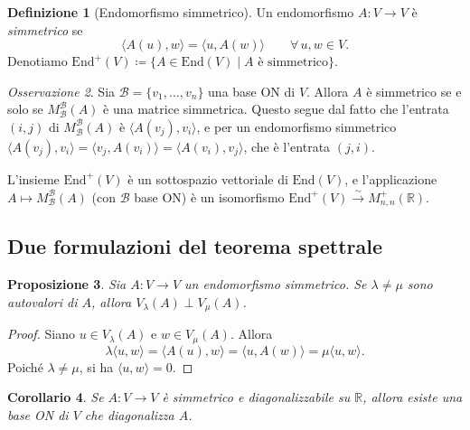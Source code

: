 \documentclass[11pt, a4paper]{book}
\theoremstyle{definition}
\newtheorem{definizione}{Definizione}[section]
\theoremstyle{plain}
\newtheorem{proposizione}[definizione]{Proposizione}
\newtheorem{corollario}[definizione]{Corollario}
\theoremstyle{remark}
\newtheorem{osservazione}[definizione]{Osservazione}
\newcommand{\R}{\mathbb{R}}
\begin{document}
\begin{defbox}
\begin{definizione}[Endomorfismo simmetrico]
\label{def:endo-simm}
Un endomorfismo $A \colon V \to V$ è \emph{simmetrico} se
\[
  \langle A(u), w \rangle = \langle u, A(w) \rangle \qquad \forall\, u, w \in V.
\]
Denotiamo $\mathrm{End}^+(V) \coloneqq \{ A \in \mathrm{End}(V) \mid A \text{ è simmetrico} \}$.
\end{definizione}
\end{defbox}

\begin{osservazione}
\label{oss:simm-matrice}
Sia $\mathcal{B} = \{v_1,\ldots,v_n\}$ una base ON di $V$. Allora $A$ è simmetrico se e solo se $M^\mathcal{B}_\mathcal{B}(A)$ è una matrice simmetrica. Questo segue dal fatto che l'entrata $(i,j)$ di $M^\mathcal{B}_\mathcal{B}(A)$ è $\langle A(v_j),v_i\rangle$, e per un endomorfismo simmetrico $\langle A(v_j),v_i\rangle = \langle v_j,A(v_i)\rangle = \langle A(v_i),v_j\rangle$, che è l'entrata $(j,i)$.
\end{osservazione}

L'insieme $\mathrm{End}^+(V)$ è un sottospazio vettoriale di $\mathrm{End}(V)$, e l'applicazione $A \mapsto M^\mathcal{B}_\mathcal{B}(A)$ (con $\mathcal{B}$ base ON) è un isomorfismo $\mathrm{End}^+(V) \xrightarrow{\sim} M^+_{n,n}(\R)$.

\subsection{Due formulazioni del teorema spettrale}

\begin{proposizione}
\label{prop:autospazi-ortogonali}
Sia $A \colon V \to V$ un endomorfismo simmetrico. Se $\lambda \neq \mu$ sono autovalori di $A$, allora $V_\lambda(A) \perp V_\mu(A)$.
\end{proposizione}

\begin{proof}
Siano $u \in V_\lambda(A)$ e $w \in V_\mu(A)$. Allora
\[
  \lambda\langle u,w\rangle = \langle A(u),w\rangle = \langle u,A(w)\rangle = \mu\langle u,w\rangle.
\]
Poiché $\lambda \neq \mu$, si ha $\langle u,w\rangle = 0$.
\end{proof}

\begin{corollario}
\label{cor:diag-ON}
Se $A \colon V \to V$ è simmetrico e diagonalizzabile su $\R$, allora esiste una base ON di $V$ che diagonalizza $A$.
\end{corollario}
\end{document}
